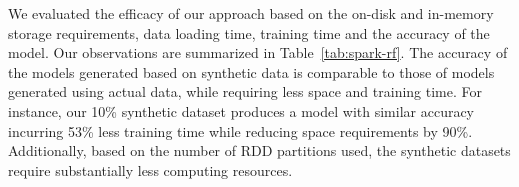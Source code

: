 We evaluated the efficacy of our approach based on the on-disk and in-memory storage requirements, data loading time, training time and the accuracy of the model.
Our observations are summarized in Table~\ref{tab:spark-rf}.
The accuracy of the models generated based on synthetic data is comparable to those of models generated using actual data, while requiring less space and training time.
For instance, our 10\% synthetic dataset produces a model with similar accuracy incurring 53\% less training time while reducing space requirements by 90\%. Additionally, based on the number of RDD partitions used, the synthetic datasets require substantially less computing resources.


